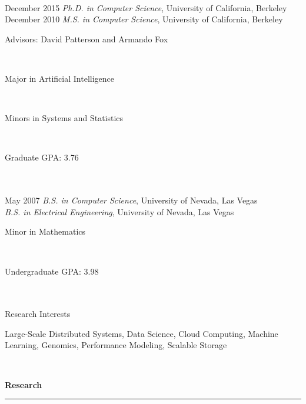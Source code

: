 \documentclass[11pt]{article}
\newcommand{\parwidth}{5.3 in}
\newcommand{\tabwidth}{1.5 in}
\newcommand{\head}[1]{
{\bf #1} \\
\rule{\textwidth}{0.01 in}

\vspace{-0.35 in}

}
\begin{document}
\begin{tabbing}
\hspace{\tabwidth} \= \\ 

December 2015 \> \emph{Ph.D. in Computer Science}, University of California, Berkeley \\ 
December 2010 \> \emph{M.S. in Computer Science}, University of California, Berkeley \\ 
\> \parbox[t]{\parwidth}{Advisors: David Patterson and Armando Fox } \\ 
\> \parbox[t]{\parwidth}{Major in Artificial Intelligence} \\
\> \parbox[t]{\parwidth}{Minors in Systems and Statistics} \\
\> \parbox[t]{\parwidth}{Graduate GPA: 3.76} \\ \\

May 2007 \> \emph{B.S. in Computer Science}, University of Nevada, Las Vegas \\ 
\> \emph{B.S. in Electrical Engineering}, University of Nevada, Las Vegas \\ 
\> \parbox[t]{\parwidth}{Minor in Mathematics} \\
\> \parbox[t]{\parwidth}{Undergraduate GPA: 3.98} \\ \\

Research Interests \> \parbox[t]{\parwidth}{
Large-Scale Distributed Systems, Data Science, Cloud Computing, Machine Learning, Genomics, Performance Modeling, Scalable Storage
} \\

\end{tabbing}



\head{Research}
\end{document}
